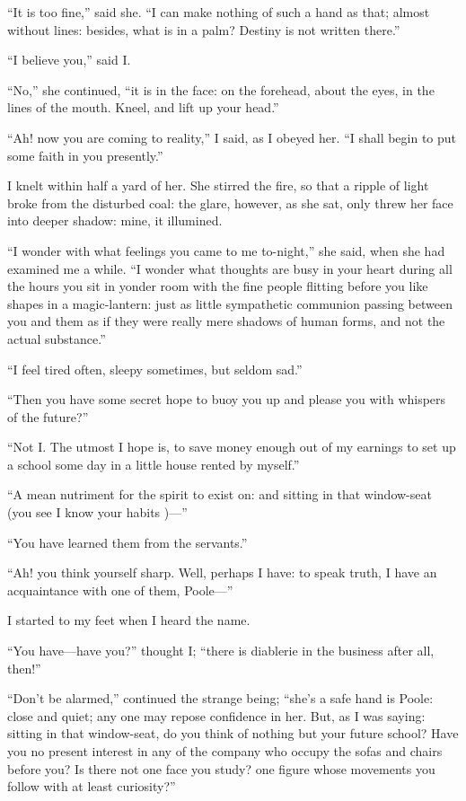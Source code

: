 \enquote{It is too fine,} said she. \enquote{I can make nothing of such
a hand as that; almost without lines: besides, what is in a palm? 
Destiny is not written there.}

\enquote{I believe you,} said I\@.

\enquote{No,} she continued, \enquote{it is in the face: on the
forehead, about the eyes, in the lines of the mouth. Kneel, and lift up
your head.}

\enquote{Ah! now you are coming to reality,} I said, as I obeyed her. 
\enquote{I shall begin to put some faith in you presently.}

I knelt within half a yard of her. She stirred the fire, so that a
ripple of light broke from the disturbed coal: the glare, however, as
she sat, only threw her face into deeper shadow: mine, it illumined.

\enquote{I wonder with what feelings you came to me to-night,} she said,
when she had examined me a while. \enquote{I wonder what thoughts are
busy in your heart during all the hours you sit in yonder room with the
fine people flitting before you like shapes in a magic-lantern: just as
little sympathetic communion passing between you and them as if they
were really mere shadows of human forms, and not the actual substance.}

\enquote{I feel tired often, sleepy sometimes, but seldom sad.}

\enquote{Then you have some secret hope to buoy you up and please you
with whispers of the future?}

\enquote{Not I\@. The utmost I hope is, to save money enough out of my
earnings to set up a school some day in a little house rented by
myself.}

\enquote{A mean nutriment for the spirit to exist on: and sitting in
that window-seat (you see I know your habits )---}

\enquote{You have learned them from the servants.}

\enquote{Ah! you think yourself sharp. Well, perhaps I have: to speak
truth, I have an acquaintance with one of them, \Mrs{} Poole---}

I started to my feet when I heard the name.

\enquote{You have---have you?} thought I; \enquote{there is diablerie in
the business after all, then!}

\enquote{Don't be alarmed,} continued the strange being; \enquote{she's
a safe hand is \Mrs{} Poole: close and quiet; any one may repose
confidence in her. But, as I was saying: sitting in that window-seat,
do you think of nothing but your future school? Have you no present
interest in any of the company who occupy the sofas and chairs before
you? Is there not one face you study? one figure whose movements you
follow with at least curiosity?}

